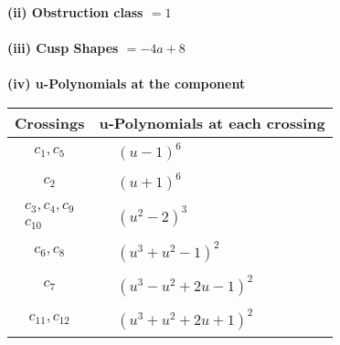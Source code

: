 \documentclass[1p]{elsarticle_modified}
\theoremstyle{definition}
\begin{document}
\flushleft \textbf{(ii) Obstruction class $= 1$}\\~\\
\flushleft \textbf{(iii) Cusp Shapes $= -4 a+8$}\\~\\
\newpage\renewcommand{\arraystretch}{1}
\flushleft \textbf{(iv) u-Polynomials at the component}\newline \\
\begin{tabular}{m{50pt}|m{274pt}}
Crossings & \hspace{64pt}u-Polynomials at each crossing \\
\hline $$\begin{aligned}c_{1},c_{5}\end{aligned}$$&$\begin{aligned}
&(u-1)^6
\end{aligned}$\\
\hline $$\begin{aligned}c_{2}\end{aligned}$$&$\begin{aligned}
&(u+1)^6
\end{aligned}$\\
\hline $$\begin{aligned}c_{3},c_{4},c_{9}\\c_{10}\end{aligned}$$&$\begin{aligned}
&(u^2-2)^3
\end{aligned}$\\
\hline $$\begin{aligned}c_{6},c_{8}\end{aligned}$$&$\begin{aligned}
&(u^3+u^2-1)^2
\end{aligned}$\\
\hline $$\begin{aligned}c_{7}\end{aligned}$$&$\begin{aligned}
&(u^3- u^2+2 u-1)^2
\end{aligned}$\\
\hline $$\begin{aligned}c_{11},c_{12}\end{aligned}$$&$\begin{aligned}
&(u^3+u^2+2 u+1)^2
\end{aligned}$\\
\hline
\end{tabular}\\~\\
\end{document}
